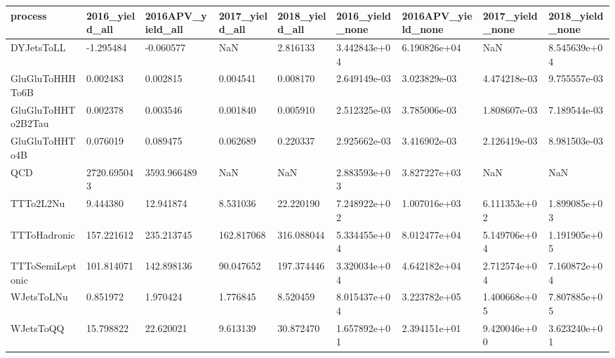 \begin{tabular}{lllllllll}
\toprule
           process & 2016\_yield\_all & 2016APV\_yield\_all & 2017\_yield\_all & 2018\_yield\_all & 2016\_yield\_none & 2016APV\_yield\_none & 2017\_yield\_none & 2018\_yield\_none \\
\midrule
        DYJetsToLL &      -1.295484 &         -0.060577 &            NaN &       2.816133 &    3.442843e+04 &       6.190826e+04 &             NaN &    8.545639e+04 \\
   GluGluToHHHTo6B &       0.002483 &          0.002815 &       0.004541 &       0.008170 &    2.649149e-03 &       3.023829e-03 &    4.474218e-03 &    9.755557e-03 \\
GluGluToHHTo2B2Tau &       0.002378 &          0.003546 &       0.001840 &       0.005910 &    2.512325e-03 &       3.785006e-03 &    1.808607e-03 &    7.189544e-03 \\
    GluGluToHHTo4B &       0.076019 &          0.089475 &       0.062689 &       0.220337 &    2.925662e-03 &       3.416902e-03 &    2.126419e-03 &    8.981503e-03 \\
               QCD &    2720.695043 &       3593.966489 &            NaN &            NaN &    2.883593e+03 &       3.827227e+03 &             NaN &             NaN \\
         TTTo2L2Nu &       9.444380 &         12.941874 &       8.531036 &      22.220190 &    7.248922e+02 &       1.007016e+03 &    6.111353e+02 &    1.899085e+03 \\
      TTToHadronic &     157.221612 &        235.213745 &     162.817068 &     316.088044 &    5.334455e+04 &       8.012477e+04 &    5.149706e+04 &    1.191905e+05 \\
  TTToSemiLeptonic &     101.814071 &        142.898136 &      90.047652 &     197.374446 &    3.320034e+04 &       4.642182e+04 &    2.712574e+04 &    7.160872e+04 \\
        WJetsToLNu &       0.851972 &          1.970424 &       1.776845 &       8.520459 &    8.015437e+04 &       3.223782e+05 &    1.400668e+05 &    7.807885e+05 \\
         WJetsToQQ &      15.798822 &         22.620021 &       9.613139 &      30.872470 &    1.657892e+01 &       2.394151e+01 &    9.420046e+00 &    3.623240e+01 \\
\bottomrule
\end{tabular}
